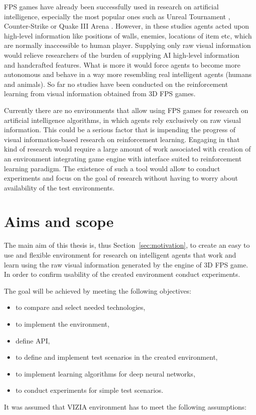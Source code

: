 FPS games have already been successfully used in research on artificial intelligence, especially the most popular ones such as Unreal Tournament \cite{6314567} \cite{6922494}, Counter-Strike \cite{5035619} or Quake III Arena \cite{el2007hybrid}.
However, in these studies agents acted upon high-level information like positions of walls, enemies, locations of item etc, which are normally inaccessible to human player.
Supplying only raw visual information would relieve researchers of the burden of supplying AI high-level information and handcrafted features.
What is more it would force agents to become more autonomous and behave in a way more resembling real intelligent agents (humans and animals).
So far no studies have been conducted on the reinforcement learning from visual information obtained from 3D FPS games.


Currently there are no environments that allow using FPS games for research on artificial intelligence algorithms, in which agents rely exclusively on raw visual information.
This could be a serious factor that is impending the progress of visual information-based research on reinforcement learning.
Engaging in that kind of research would require a large amount of work associated with creation of an environment integrating game engine with interface suited to reinforcement learning paradigm.
The existence of such a tool would allow to conduct experiments and focus on the goal of research without having to worry about availability of the test environments.
 

\section{Aims and scope}
The main aim of this thesis is, thus Section~\ref{sec:motivation}, to create an easy to use and flexible environment for research on intelligent agents that work and learn using the raw visual information generated by the engine of 3D FPS game. 
In order to confirm usability of the created environment conduct experiments.%

The goal will be achieved by meeting the following objectives:
\begin{itemize}
 \item to compare and select needed technologies,
 \item to implement the environment,
 \item define API,
 \item to define and implement test scenarios in the created environment,
 \item to implement learning algorithms for deep neural networks,
 \item to conduct experiments for simple test scenarios.
\end{itemize}
It was assumed that VIZIA environment has to meet the following assumptions:


